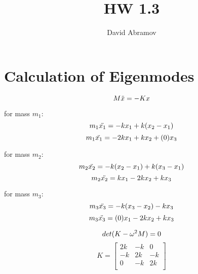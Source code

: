 \documentclass[11pt, oneside]{article}   	%
\title{HW 1.3}
\author{David Abramov}
\begin{document}
\maketitle

\section{Calculation of Eigenmodes}


\begin{equation}
M\ddot{x} = -Kx\\
\end{equation}

for mass $m_1$:\\
\begin{equation}
m_1\ddot{x_1} = -kx_1 + k(x_2 - x_1) \\
\end{equation}
\begin{equation}
m_1\ddot{x_1} = -2kx_1 + kx_2 + (0)x_3\\
\end{equation}

for mass $m_2$: \\
\begin{equation}
m_2\ddot{x_2} = -k(x_2 - x_1) + k(x_3 - x_1) \\
\end{equation}
\begin{equation}
m_2\ddot{x_2} = kx_1 - 2kx_2 + kx_3\\
\end{equation}

for mass $m_3$: \\
\begin{equation}
m_3\ddot{x_3} = -k(x_3 - x_2) - kx_3 \\
\end{equation}
\begin{equation}
m_3\ddot{x_3} = (0)x_1 - 2kx_2 + kx_3 \\ 
\end{equation}

\begin{equation}
det(K - \omega^2M) = 0 \\
\end{equation}
\begin{equation}
K=
\begin{bmatrix}
    2k  & -k & 0 \\
    -k  & 2k & -k \\
    0   & -k & 2k \\
\end{bmatrix}
\end{equation}
\end{document}
